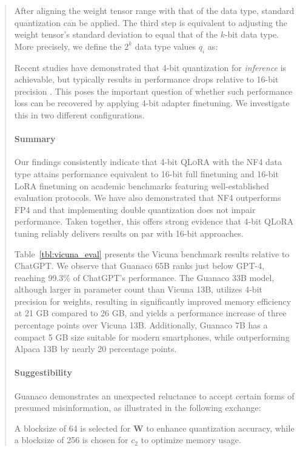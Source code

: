 \begin{quote}
After aligning the weight tensor range with that of the data type, standard quantization can be applied. The third step is equivalent to adjusting the weight tensor's standard deviation to equal that of the $k$-bit data type. More precisely, we define the $2^k$ data type values $q_i$ as:

Recent studies have demonstrated that 4-bit quantization for \emph{inference} is achievable, but typically results in performance drops relative to 16-bit precision \citep{dettmers2022case,frantar2022gptq}. This poses the important question of whether such performance loss can be recovered by applying 4-bit adapter finetuning. We investigate this in two different configurations.

\paragraph{Summary} Our findings consistently indicate that 4-bit \textsc{QLoRA} with the NF4 data type attains performance equivalent to 16-bit full finetuning and 16-bit LoRA finetuning on academic benchmarks featuring well-established evaluation protocols. We have also demonstrated that NF4 outperforms FP4 and that implementing double quantization does not impair performance. Taken together, this offers strong evidence that 4-bit \textsc{QLoRA} tuning reliably delivers results on par with 16-bit approaches.

Table~\ref{tbl:vicuna_eval} presents the Vicuna benchmark \cite{vicuna2023} results relative to ChatGPT. We observe that {Guanaco} 65B ranks just below GPT-4, reaching 99.3\% of ChatGPT's performance. The {Guanaco} 33B model, although larger in parameter count than Vicuna 13B, utilizes 4-bit precision for weights, resulting in significantly improved memory efficiency at 21 GB compared to 26 GB, and yields a performance increase of three percentage points over Vicuna 13B. Additionally, {Guanaco} 7B has a compact 5 GB size suitable for modern smartphones, while outperforming Alpaca 13B by nearly 20 percentage points.



\paragraph{Suggestibility} {Guanaco} demonstrates an unexpected reluctance to accept certain forms of presumed misinformation, as illustrated in the following exchange:

A blocksize of 64 is selected for $\mathbf{W}$ to enhance quantization accuracy, while a blocksize of 256 is chosen for $c_2$ to optimize memory usage.


\end{quote}

